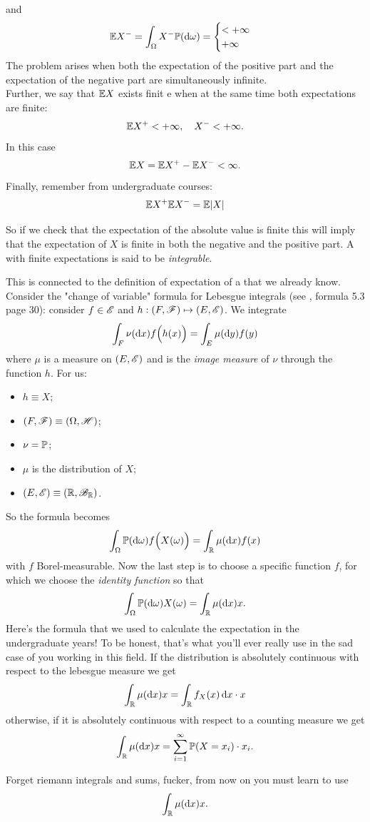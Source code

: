 \documentclass{report}
\begin{document}
and
\[\mathbb{E} X^-=\int_\Omega X^-\mathbb{P}(\mathop{}\!\mathrm{d}\omega)=\begin{cases}
	<+\infty\\
	+\infty
\end{cases}\]
The problem arises when both the expectation of the positive part and the expectation of the negative part are simultaneously infinite.\\
Further, we say that $\mathbb{E} X$ exists finit e when at the same time both expectations are finite: 
\[\mathbb{E} X^+<+\infty,\quad X^-<+\infty.\]
In this case
\[\mathbb{E} X=\mathbb{E} X^+-\mathbb{E} X^-<\infty.\]
Finally, remember from undergraduate courses:
\[\mathbb{E} X^+\mathbb{E} X^-=\mathbb{E} |X|\]

So if we check that the expectation of the absolute value is finite this will imply that the expectation of $X$ is finite in both the negative and the positive part. A \rv{} with finite expectations is said to be \emph{integrable}.
\begin{remark}\label{eh}
	This is connected to the definition of expectation of a \rv{} that we already know. Consider the "change of variable" formula for Lebesgue integrals (see \cinlar, formula 5.3 page 30): consider $f\in\mathscr{E}$ and $h:(F,\mathscr{F})\mapsto(E,\mathscr{E})$. We integrate
	\[\int_F\nu(\mathop{}\!\mathrm{d} x)f\Big(h(x)\Big)=\int_E\mu(\mathop{}\!\mathrm{d} y)f(y)\]
	where $\mu$ is a measure on $(E,\mathscr{E})$ and is the \textit{image measure} of $\nu$ through the function $h$. For us:
	\begin{itemize}
		\item $h\equiv X$;
		\item $(F,\mathscr{F})\equiv(\Omega,\mathscr{H})$;
		\item $\nu=\mathbb{P}$;
		\item $\mu$ is the distribution of $X$;
		\item $(E,\mathscr{E})\equiv(\mathbb{R},\mathscr{B}_{\mathbb{R}})$.
	\end{itemize}
	So the formula becomes
	\[\int_\Omega\mathbb{P}(\mathop{}\!\mathrm{d}\omega)f\Big(X(\omega)\Big)=\int_{\mathbb{R}}\mu(\mathop{}\!\mathrm{d} x)f(x)\]
	with $f$ Borel-measurable. Now the last step is to choose a specific function $f$, for which we choose the \textit{identity function} so that
	\[\int_\Omega\mathbb{P}(\mathop{}\!\mathrm{d}\omega)X(\omega)=\int_{\mathbb{R}}\mu(\mathop{}\!\mathrm{d} x)x.\]
	Here's the formula that we used to calculate the expectation in the undergraduate years! To be honest, that's what you'll ever really use in the sad case of you working in this field. If the distribution is absolutely continuous with respect to the lebesgue measure we get
	\[\int_{\mathbb{R}}\mu(\mathop{}\!\mathrm{d} x)x=\int_{\mathbb{R}}f_X(x)\mathop{}\!\mathrm{d} x\cdot x\]
	otherwise, if it is absolutely continuous with respect to a counting measure we get
	\[\int_{\mathbb{R}}\mu(\mathop{}\!\mathrm{d} x)x=\sum_{i=1}^{\infty}\mathbb{P}(X=x_i)\cdot x_i.\]
	\begin{notation}
		Forget riemann integrals and sums, fucker, from now on you must learn to use 
		\[\int_{\mathbb{R}}\mu(\mathop{}\!\mathrm{d} x)x.\]
	\end{notation}
\end{remark}
\end{document}
